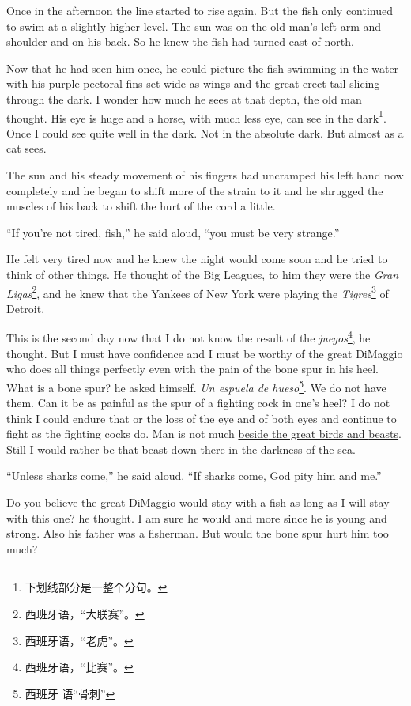\documentclass[fontset=ubuntu,zihao=-4]{ctexrep}
\begin{document}
Once in the afternoon the line started to rise again. But the fish only
continued to swim at a \gls{slightly} higher level. The sun was on the old
man's left arm and shoulder and on his back. So he knew the fish had turned
east of north.

Now that he had seen him once, he could picture the fish swimming in the
water with his purple pectoral fins set wide as wings and the great
\gls{erect} tail \gls{slicing} through the dark. I wonder how much he sees
at that depth, the old man thought. His eye is huge and \uline{a horse, with
  much less eye, can see in the dark}\footnote{下划线部分是一整个分句。}.
Once I could see quite well in the dark. Not in the \gls{absolute} dark. But
almost as a cat sees.

The sun and his steady movement of his fingers had uncramped his left hand
now completely and he began to shift more of the strain to it and he
\gls{shrugged} the \glspl{muscle} of his back to shift the hurt of the cord
a little.

``If you're not tired, fish,'' he said aloud, ``you must be very strange.''

He felt very tired now and he knew the night would come soon and he tried to
think of other things. He thought of the Big Leagues, to him they were the
\emph{Gran Ligas}\footnote{西班牙语，“大联赛”。}, and he knew that the
Yankees of New York were playing the \emph{Tigres}\footnote{西班牙语，“老虎”。} of Detroit.

This is the second day now that I do not know the result of the
\emph{juegos}\footnote{西班牙语，“比赛”。}, he thought. But I must have
confidence and I must be worthy of the great DiMaggio who does all things
perfectly even with the pain of the bone \gls{spur} in his \gls{heel}. What
is a bone spur? he asked himself. \emph{Un espuela de hueso}\footnote{西班牙
  语“骨刺”}. We do not have them. Can it be as painful as the spur of a
fighting cock in one's heel? I do not think I could endure that or the loss
of the eye and of both eyes and continue to fight as the fighting cocks do.
Man is not much \uline{\gls{beside} the great birds and \glspl{beast}}.
Still I would rather be that beast down there in the darkness of the sea.

``Unless sharks come,'' he said aloud. ``If sharks come, God pity him and me.''

Do you believe the great DiMaggio would stay with a fish as long as I will
stay with this one? he thought. I am sure he would and more since he is
young and strong. Also his father was a fisherman. But would the bone spur
hurt him too much?
\end{document}
